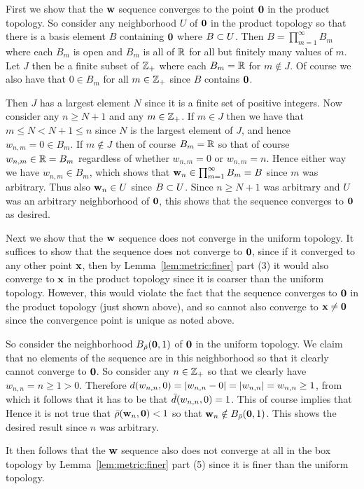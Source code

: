 {{    First we show that the $\vw$ sequence converges to the point $\vze$ in the product topology.
    So consider any neighborhood $U$ of $\vze$ in the product topology so that there is a basis element $B$ containing $\vze$ where $B \ss U$.
    Then $B = \prod_{m=1}^\infty B_m$ where each $B_m$ is open and $B_m$ is all of $\reals$ for all but finitely many values of $m$.
    Let $J$ then be a finite subset of $\pints$ where each $B_m = \reals$ for $m \notin J$.
    Of course we also have that $0 \in B_m$ for all $m \in \pints$ since $B$ contains $\vze$.

    Then $J$ has a largest element $N$ since it is a finite set of positive integers.
    Now consider any $n \geq N+1$ and any $m \in \pints$.
    If $m \in J$ then we have that $m \leq N < N+1 \leq n$ since $N$ is the largest element of $J$, and hence $w_{n,m} = 0 \in B_m$.
    If $m \notin J$ then of course $B_m = \reals$ so that of course $w_{n,m} \in \reals = B_m$ regardless of whether $w_{n,m} = 0$ or $w_{n,m} = n$.
    Hence either way we have $w_{n,m} \in B_m$, which shows that $\vw_n \in \prod_{m=1}^\infty B_m = B$ since $m$ was arbitrary.
    Thus also $\vw_n \in U$ since $B \ss U$.
    Since $n \geq N+1$ was arbitrary and $U$ was an arbitrary neighborhood of $\vze$, this shows that the sequence converges to $\vze$ as desired.
    
    Next we show that the $\vw$ sequence does not converge in the uniform topology.
    It suffices to show that the sequence does not converge to $\vze$, since if it converged to any other point $\vx$, then by Lemma~\ref{lem:metric:finer} part (3) it would also converge to $\vx$ in the product topology since it is coarser than the uniform topology.
    However, this would violate the fact that the sequence converges to $\vze$ in the product topology (just shown above), and so cannot also converge to $\vx \neq \vze$ since the convergence point is unique as noted above.

    So consider the neighborhood $B_{\br}(\vze, 1)$ of $\vze$ in the uniform topology.
    We claim that no elements of the sequence are in this neighborhood so that it clearly cannot converge to $\vze$.
    So consider any $n \in \pints$ so that we clearly have $w_{n,n} = n \geq 1 > 0$.
    Therefore $d(w_{n,n}, 0) = \abs{w_{n,n} - 0} = \abs{w_{n,n}} = w_{n,n} \geq 1$, from which it follows that it has to be that $\bd(w_{n,n}, 0) = 1$.
    This of course implies that
    Hence it is not true that $\br(\vw_n, \vze) < 1$ so that $\vw_n \notin B_{\br}(\vze, 1)$.
    This shows the desired result since $n$ was arbitrary.

    It then follows that the $\vw$ sequence also does not converge at all in the box topology by Lemma~\ref{lem:metric:finer} part (5) since it is finer than the uniform topology.
  }
}
